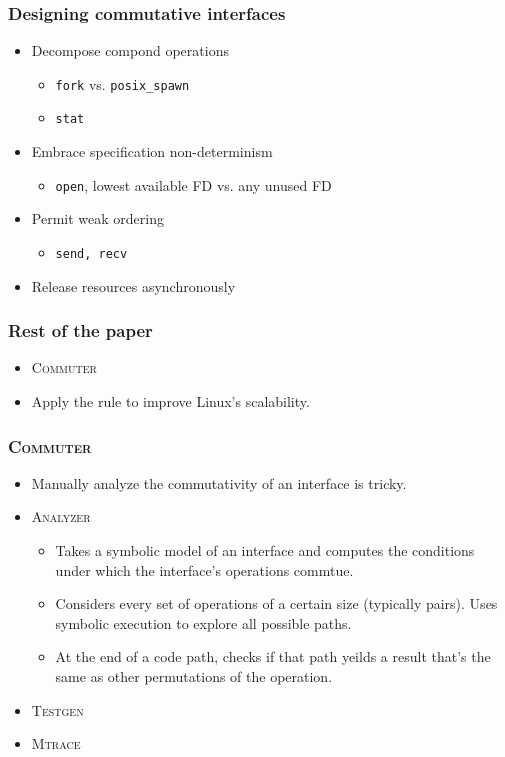\documentclass{beamer}
\begin{document}
\begin{frame}
\frametitle{Designing commutative interfaces}
\begin{itemize}
\item Decompose compond operations
\begin{itemize}
\item \texttt{fork} vs. \texttt{posix\_spawn}
\item \texttt{stat}
\end{itemize}
\item Embrace specification non-determinism
\begin{itemize}
\item \texttt{open}, lowest available FD vs. any unused FD
\end{itemize}
\item Permit weak ordering
\begin{itemize}
\item \texttt{send, recv}
\end{itemize}
\item Release resources asynchronously
\end{itemize}
\end{frame}

\begin{frame}
\frametitle{Rest of the paper}
\begin{itemize}
\item \textsc{Commuter}
\item Apply the rule to improve Linux's scalability.
\end{itemize}
\end{frame}

\begin{frame}
\frametitle{\textsc{Commuter}}
\begin{itemize}
\item Manually analyze the commutativity of an interface is tricky.
\item \textsc{Analyzer}
\begin{itemize}
\item Takes a symbolic model of an interface and computes the conditions under which
the interface's operations commtue.
\item Considers every set of operations of a certain size (typically pairs). 
Uses symbolic execution to explore all possible paths.
\item At the end of a code path, checks if that path yeilds a result that's the 
same as other permutations of the operation.
\end{itemize}
\item \textsc{Testgen}
\item \textsc{Mtrace}
\end{itemize}
\end{frame}
\end{document}
